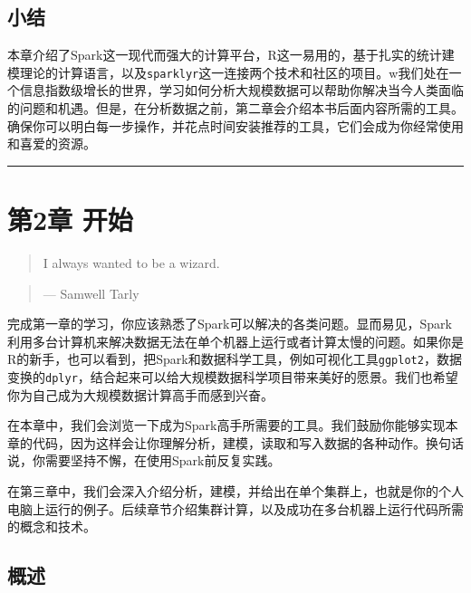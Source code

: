 \documentclass[
]{article}
\begin{document}
\hypertarget{ux5c0fux7ed3}{%
\subsection{小结}\label{ux5c0fux7ed3}}

本章介绍了Spark这一现代而强大的计算平台，R这一易用的，基于扎实的统计建模理论的计算语言，以及\texttt{sparklyr}这一连接两个技术和社区的项目。w我们处在一个信息指数级增长的世界，学习如何分析大规模数据可以帮助你解决当今人类面临的问题和机遇。但是，在分析数据之前，第二章会介绍本书后面内容所需的工具。确保你可以明白每一步操作，并花点时间安装推荐的工具，它们会成为你经常使用和喜爱的资源。

\begin{center}\rule{0.5\linewidth}{\linethickness}\end{center}

\hypertarget{ux7b2c2ux7ae0-ux5f00ux59cb}{%
\section{第2章 开始}\label{ux7b2c2ux7ae0-ux5f00ux59cb}}

\begin{quote}
I always wanted to be a wizard.
\end{quote}

\begin{quote}
--- Samwell Tarly
\end{quote}

完成第一章的学习，你应该熟悉了Spark可以解决的各类问题。显而易见，Spark利用多台计算机来解决数据无法在单个机器上运行或者计算太慢的问题。如果你是R的新手，也可以看到，把Spark和数据科学工具，例如可视化工具\texttt{ggplot2}，数据变换的\texttt{dplyr}，结合起来可以给大规模数据科学项目带来美好的愿景。我们也希望你为自己成为大规模数据计算高手而感到兴奋。

在本章中，我们会浏览一下成为Spark高手所需要的工具。我们鼓励你能够实现本章的代码，因为这样会让你理解分析，建模，读取和写入数据的各种动作。换句话说，你需要坚持不懈，在使用Spark前反复实践。

在第三章中，我们会深入介绍分析，建模，并给出在单个集群上，也就是你的个人电脑上运行的例子。后续章节介绍集群计算，以及成功在多台机器上运行代码所需的概念和技术。

\hypertarget{ux6982ux8ff0-1}{%
\subsection{概述}\label{ux6982ux8ff0-1}}
\end{document}
